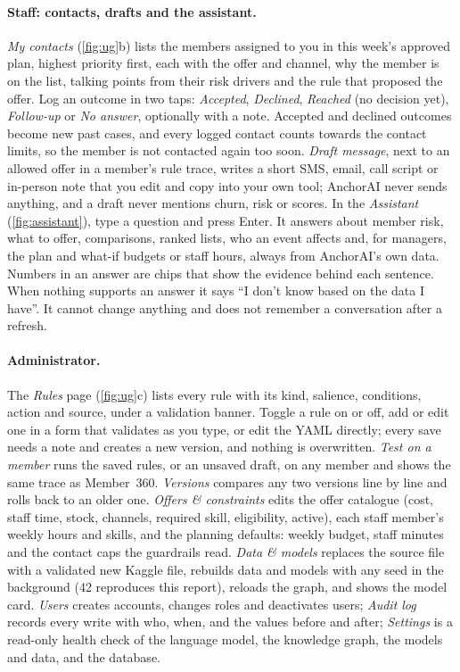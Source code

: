 \documentclass[paper=a4, fontsize=11pt, open=any, parskip=half-,
  headings=small, numbers=noenddot, captions=tableheading, toc=flat]{scrreprt}
\begin{document}
\paragraph{Staff: contacts, drafts and the assistant.} \emph{My contacts} (\cref{fig:ug}b) lists the members assigned to you in this week's approved plan, highest priority first, each with the offer and channel, why the member is on the list, talking points from their risk drivers and the rule that proposed the offer. Log an outcome in two taps: \emph{Accepted}, \emph{Declined}, \emph{Reached} (no decision yet), \emph{Follow-up} or \emph{No answer}, optionally with a note. Accepted and declined outcomes become new past cases, and every logged contact counts towards the contact limits, so the member is not contacted again too soon. \emph{Draft message}, next to an allowed offer in a member's rule trace, writes a short SMS, email, call script or in-person note that you edit and copy into your own tool; AnchorAI never sends anything, and a draft never mentions churn, risk or scores. In the \emph{Assistant} (\cref{fig:assistant}), type a question and press Enter. It answers about member risk, what to offer, comparisons, ranked lists, who an event affects and, for managers, the plan and what-if budgets or staff hours, always from AnchorAI's own data. Numbers in an answer are chips that show the evidence behind each sentence. When nothing supports an answer it says \enquote{I don't know based on the data I have}. It cannot change anything and does not remember a conversation after a refresh.

\paragraph{Administrator.} The \emph{Rules} page (\cref{fig:ug}c) lists every rule with its kind, salience, conditions, action and source, under a validation banner. Toggle a rule on or off, add or edit one in a form that validates as you type, or edit the YAML directly; every save needs a note and creates a new version, and nothing is overwritten. \emph{Test on a member} runs the saved rules, or an unsaved draft, on any member and shows the same trace as Member~360. \emph{Versions} compares any two versions line by line and rolls back to an older one. \emph{Offers \& constraints} edits the offer catalogue (cost, staff time, stock, channels, required skill, eligibility, active), each staff member's weekly hours and skills, and the planning defaults: weekly budget, staff minutes and the contact caps the guardrails read. \emph{Data \& models} replaces the source file with a validated new Kaggle file, rebuilds data and models with any seed in the background (42 reproduces this report), reloads the graph, and shows the model card. \emph{Users} creates accounts, changes roles and deactivates users; \emph{Audit log} records every write with who, when, and the values before and after; \emph{Settings} is a read-only health check of the language model, the knowledge graph, the models and data, and the database.

\begingroup\let\chapter\section

\endgroup
\end{document}
